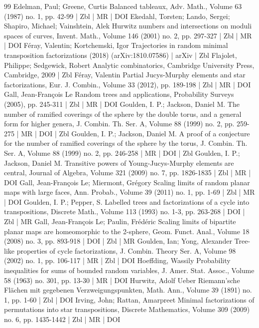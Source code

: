 \begin{thebibliography}{99}
Edelman, Paul; Greene, Curtis Balanced tableaux, Adv. Math., Volume 63 (1987) no. 1, pp. 42-99 | Zbl | MR | DOI
Ekedahl, Torsten; Lando, Sergei; Shapiro, Michael; Vainshtein, Alek Hurwitz numbers and intersections on moduli spaces of curves, Invent. Math., Volume 146 (2001) no. 2, pp. 297-327 | Zbl | MR | DOI
Féray, Valentin; Kortchemski, Igor Trajectories in random minimal transposition factorizations (2018) (arXiv:1810.07586) | arXiv | Zbl
Flajolet, Philippe; Sedgewick, Robert Analytic combinatorics, Cambridge University Press, Cambridge, 2009 | Zbl
Féray, Valentin Partial Jucys-Murphy elements and star factorizations, Eur. J. Combin., Volume 33 (2012), pp. 189-198 | Zbl | MR | DOI
Gall, Jean-François Le Random trees and applications, Probability Surveys (2005), pp. 245-311 | Zbl | MR | DOI
Goulden, I. P.; Jackson, Daniel M. The number of ramified coverings of the sphere by the double torus, and a general form for higher genera, J. Combin. Th. Ser. A, Volume 88 (1999) no. 2, pp. 259-275 | MR | DOI | Zbl
Goulden, I. P.; Jackson, Daniel M. A proof of a conjecture for the number of ramified coverings of the sphere by the torus, J. Combin. Th. Ser. A, Volume 88 (1999) no. 2, pp. 246-258 | MR | DOI | Zbl
Goulden, I. P.; Jackson, Daniel M. Transitive powers of Young-Jucys-Murphy elements are central, Journal of Algebra, Volume 321 (2009) no. 7, pp. 1826-1835 | Zbl | MR | DOI
Gall, Jean-François Le; Miermont, Grégory Scaling limits of random planar maps with large faces, Ann. Probab., Volume 39 (2011) no. 1, pp. 1-69 | Zbl | MR | DOI
Goulden, I. P.; Pepper, S. Labelled trees and factorizations of a cycle into transpositions, Discrete Math., Volume 113 (1993) no. 1-3, pp. 263-268 | DOI | Zbl | MR
Gall, Jean-François Le; Paulin, Frédéric Scaling limits of bipartite planar maps are homeomorphic to the 2-sphere, Geom. Funct. Anal., Volume 18 (2008) no. 3, pp. 893-918 | DOI | Zbl | MR
Goulden, Ian; Yong, Alexander Tree-like properties of cycle factorizations, J. Combin. Theory Ser. A, Volume 98 (2002) no. 1, pp. 106-117 | MR | Zbl | DOI
Hoeffding, Wassily Probability inequalities for sums of bounded random variables, J. Amer. Stat. Assoc., Volume 58 (1963) no. 301, pp. 13-30 | MR | DOI
Hurwitz, Adolf Ueber Riemann’sche Flächen mit gegebenen Verzweigungspunkten, Math. Ann., Volume 39 (1891) no. 1, pp. 1-60 | Zbl | DOI
Irving, John; Rattan, Amarpreet Minimal factorizations of permutations into star transpositions, Discrete Mathematics, Volume 309 (2009) no. 6, pp. 1435-1442 | Zbl | MR | DOI

\end{thebibliography}
